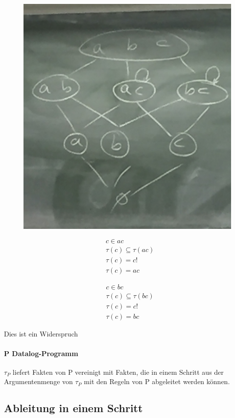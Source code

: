 \documentclass[12pt, a4paper]{article}
\begin{document}
\begin{figure}
\centering
\includegraphics[width=0.7\linewidth]{img/img1}
\caption{}
\label{fig:img1}
\end{figure}
\begin{equation}
\begin{split}
&c \in ac \\
&\tau(c) \subseteq \tau(ac) \\
&\tau(c) = c! \\ %
&\tau(c) = ac
\end{split}
\end{equation}

\begin{equation}
\begin{split}
&c \in bc \\
&\tau(c) \subseteq \tau(bc) \\
&\tau(c) = c! \\  %
&\tau(c) = bc
\end{split}
\end{equation}

Dies ist ein Widerspruch


\paragraph{P Datalog-Programm}
$\tau_P$ liefert Fakten von P vereinigt mit Fakten, die in einem Schritt aus der Argumentenmenge von $\tau_P$ mit den Regeln von P abgeleitet werden können.

\subsection*{Ableitung in einem Schritt}
\end{document}
